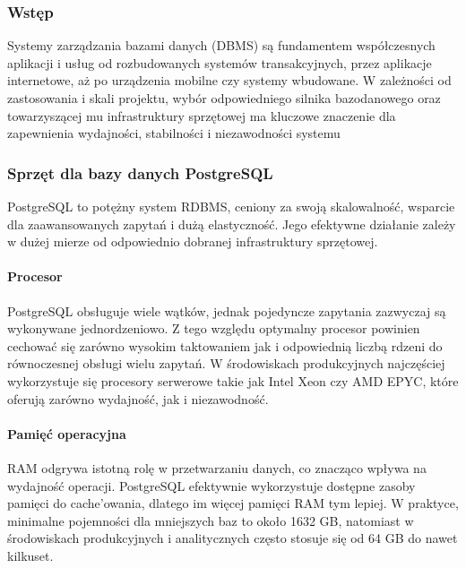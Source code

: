 \documentclass[letterpaper,10pt,polish]{sphinxmanual}
\begin{document}
\subsubsection{Wstęp}
\label{\detokenize{rozdzial2/Sprzet-dla-bazy-danych/source/SprzetDlaBazyDanych:wstep}}
\sphinxAtStartPar
Systemy zarządzania bazami danych (DBMS) są fundamentem współczesnych aplikacji i usług \textendash{} od rozbudowanych systemów transakcyjnych, przez aplikacje internetowe, aż po urządzenia mobilne czy systemy wbudowane. W zależności od zastosowania i skali projektu, wybór odpowiedniego silnika bazodanowego oraz towarzyszącej mu infrastruktury sprzętowej ma kluczowe znaczenie dla zapewnienia wydajności, stabilności i niezawodności systemu


\subsubsection{Sprzęt dla bazy danych PostgreSQL}
\label{\detokenize{rozdzial2/Sprzet-dla-bazy-danych/source/SprzetDlaBazyDanych:sprzet-dla-bazy-danych-postgresql}}
\sphinxAtStartPar
PostgreSQL to potężny system RDBMS, ceniony za swoją skalowalność, wsparcie dla zaawansowanych zapytań i dużą elastyczność. Jego efektywne działanie zależy w dużej mierze od odpowiednio dobranej infrastruktury sprzętowej.


\paragraph{Procesor}
\label{\detokenize{rozdzial2/Sprzet-dla-bazy-danych/source/SprzetDlaBazyDanych:procesor}}
\sphinxAtStartPar
PostgreSQL obsługuje wiele wątków, jednak pojedyncze zapytania zazwyczaj są wykonywane jednordzeniowo. Z tego względu optymalny procesor powinien cechować się zarówno wysokim taktowaniem jak i odpowiednią liczbą rdzeni do równoczesnej obsługi wielu zapytań. W środowiskach produkcyjnych najczęściej wykorzystuje się procesory serwerowe takie jak Intel Xeon czy AMD EPYC, które oferują zarówno wydajność, jak i niezawodność.


\paragraph{Pamięć operacyjna}
\label{\detokenize{rozdzial2/Sprzet-dla-bazy-danych/source/SprzetDlaBazyDanych:pamiec-operacyjna}}
\sphinxAtStartPar
RAM odgrywa istotną rolę w przetwarzaniu danych, co znacząco wpływa na wydajność operacji. PostgreSQL efektywnie wykorzystuje dostępne zasoby pamięci do cache’owania, dlatego im więcej pamięci RAM tym lepiej. W praktyce, minimalne pojemności dla mniejszych baz to około 16\textendash{}32 GB, natomiast w środowiskach produkcyjnych i analitycznych często stosuje się od 64 GB do nawet kilkuset.
\end{document}
